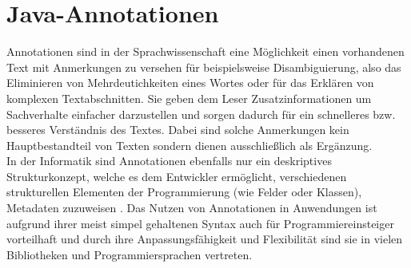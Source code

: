 
\section{Java-Annotationen}
\label{java_annotationen}
Annotationen sind in der Sprachwissenschaft eine Möglichkeit einen vorhandenen Text mit Anmerkungen zu versehen für beispielsweise Disambiguierung, also das Eliminieren von Mehrdeutichkeiten eines Wortes oder für das Erklären von komplexen Textabschnitten. Sie geben dem Leser Zusatzinformationen um Sachverhalte einfacher darzustellen und sorgen dadurch für ein schnelleres bzw. besseres Verständnis des Textes. Dabei sind solche Anmerkungen kein Hauptbestandteil von Texten sondern dienen ausschließlich als Ergänzung.\\
In der Informatik sind Annotationen ebenfalls nur ein deskriptives Strukturkonzept, welche es dem Entwickler ermöglicht, verschiedenen strukturellen Elementen der Programmierung (wie Felder oder Klassen), Metadaten zuzuweisen \cite{Yu2019}. Das Nutzen von Annotationen in Anwendungen ist aufgrund ihrer meist simpel gehaltenen Syntax auch für Programmiereinsteiger vorteilhaft und durch ihre Anpassungsfähigkeit und Flexibilität sind sie in vielen Bibliotheken und Programmiersprachen vertreten.
